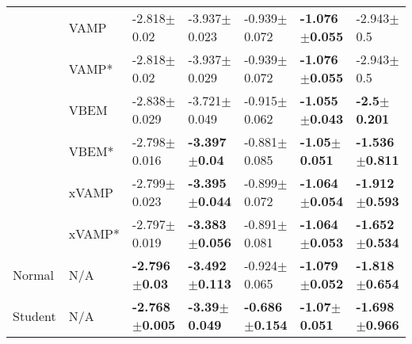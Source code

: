 \begin{tabular}{lllllll}
        & VAMP &            -2.818$\pm$0.02 &           -3.937$\pm$0.023 &           -0.939$\pm$0.072 &  \textbf{-1.076$\pm$0.055} &             -2.943$\pm$0.5 \\
        & VAMP* &            -2.818$\pm$0.02 &           -3.937$\pm$0.029 &           -0.939$\pm$0.072 &  \textbf{-1.076$\pm$0.055} &             -2.943$\pm$0.5 \\
        & VBEM &           -2.838$\pm$0.029 &           -3.721$\pm$0.049 &           -0.915$\pm$0.062 &  \textbf{-1.055$\pm$0.043} &    \textbf{-2.5$\pm$0.201} \\
        & VBEM* &           -2.798$\pm$0.016 &   \textbf{-3.397$\pm$0.04} &           -0.881$\pm$0.085 &   \textbf{-1.05$\pm$0.051} &  \textbf{-1.536$\pm$0.811} \\
        & xVAMP &           -2.799$\pm$0.023 &  \textbf{-3.395$\pm$0.044} &           -0.899$\pm$0.072 &  \textbf{-1.064$\pm$0.054} &  \textbf{-1.912$\pm$0.593} \\
        & xVAMP* &           -2.797$\pm$0.019 &  \textbf{-3.383$\pm$0.056} &           -0.891$\pm$0.081 &  \textbf{-1.064$\pm$0.053} &  \textbf{-1.652$\pm$0.534} \\
Normal & N/A &   \textbf{-2.796$\pm$0.03} &  \textbf{-3.492$\pm$0.113} &           -0.924$\pm$0.065 &  \textbf{-1.079$\pm$0.052} &  \textbf{-1.818$\pm$0.654} \\
Student & N/A &  \textbf{-2.768$\pm$0.005} &   \textbf{-3.39$\pm$0.049} &  \textbf{-0.686$\pm$0.154} &   \textbf{-1.07$\pm$0.051} &  \textbf{-1.698$\pm$0.966} \\
\bottomrule
\end{tabular}

